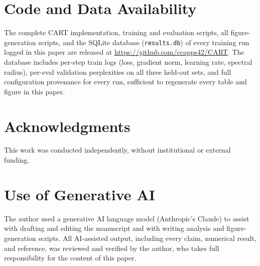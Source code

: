 \documentclass{article}
\newcommand{\cart}{\textsc{CART}}
\begin{document}
\section*{Code and Data Availability}

The complete \cart{} implementation, training and evaluation scripts, all figure-generation scripts, and the SQLite database (\texttt{results.db}) of every training run logged in this paper are released at \url{https://github.com/ccapps42/CART}. The database includes per-step train logs (loss, gradient norm, learning rate, spectral radius), per-eval validation perplexities on all three held-out sets, and full configuration provenance for every run, sufficient to regenerate every table and figure in this paper.

\section*{Acknowledgments}

This work was conducted independently, without institutional or external funding.

\section*{Use of Generative AI}

The author used a generative AI language model (Anthropic's Claude) to assist with drafting and editing the manuscript and with writing analysis and figure-generation scripts. All AI-assisted output, including every claim, numerical result, and reference, was reviewed and verified by the author, who takes full responsibility for the content of this paper.



\end{document}
